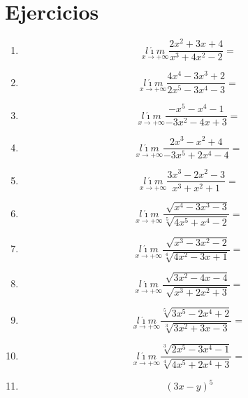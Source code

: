 \documentclass[oneside,spanish,letter]{article}
\begin{document}
\section{Ejercicios}
\begin{enumerate}
 \item $$\underset{x\rightarrow +\infty}{l\acute{\imath}m} \frac{2x^2+3x+4}{x^3+4x^2-2}=$$
 \item $$\underset{x\rightarrow +\infty}{l\acute{\imath}m} \frac{4x^4-3x^3+2}{2x^5-3x^4-3}=$$
 \item $$\underset{x\rightarrow +\infty}{l\acute{\imath}m} \frac{-x^5-x^4-1}{-3x^2-4x+3}=$$
 \item $$\underset{x\rightarrow +\infty}{l\acute{\imath}m} \frac{2x^3-x^2+4}{-3x^5+2x^4-4}=$$
 \item $$\underset{x\rightarrow +\infty}{l\acute{\imath}m} \frac{3x^3-2x^2-3}{x^3+x^2+1}=$$
 \item $$\underset{x\rightarrow +\infty}{l\acute{\imath}m} \frac{\sqrt[]{x^4-3x^3-3}}{\sqrt[5]{4x^5+x^4-2}}=$$
 \item $$\underset{x\rightarrow +\infty}{l\acute{\imath}m} \frac{\sqrt[]{x^3-3x^2-2}}{\sqrt[4]{4x^2-3x+1}}=$$
 \item $$\underset{x\rightarrow +\infty}{l\acute{\imath}m} \frac{\sqrt[]{3x^2-4x-4}}{\sqrt[]{x^3+2x^2+3}}=$$
 \item $$\underset{x\rightarrow +\infty}{l\acute{\imath}m} \frac{\sqrt[5]{3x^5-2x^4+2}}{\sqrt[3]{3x^2+3x-3}}=$$
 \item $$\underset{x\rightarrow +\infty}{l\acute{\imath}m} \frac{\sqrt[3]{2x^5-3x^4-1}}{\sqrt[4]{4x^5+2x^4+3}}=$$
\item $$(3x-y)^5$$
 \end{enumerate}
  \newpage
\end{document}
